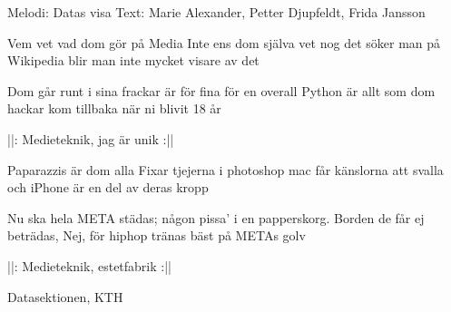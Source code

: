 \begin{song}

\begin{songmeta}
Melodi: Datas visa
Text: Marie Alexander, Petter Djupfeldt, Frida Jansson
\end{songmeta}

\begin{songtext}
Vem vet vad dom gör på Media
Inte ens dom själva vet nog det
söker man på Wikipedia
blir man inte mycket visare av det

Dom går runt i sina frackar
är för fina för en overall
Python är allt som dom hackar
kom tillbaka när ni blivit 18 år

||: Medieteknik, jag är unik :||

Paparazzis är dom alla
Fixar tjejerna i photoshop
mac får känslorna att svalla
och iPhone är en del av deras kropp

Nu ska hela META städas;
någon pissa' i en papperskorg.
Borden de får ej beträdas,
Nej, för hiphop tränas bäst på METAs golv

||: Medieteknik, estetfabrik :||
\end{songtext}

\begin{songnotes}
\noindent Datasektionen, KTH
\end{songnotes}

\end{song}
